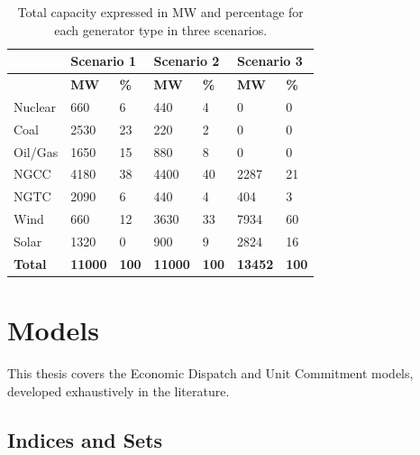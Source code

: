 \documentclass[12pt,LUDisStyle,twosided]{book}
\begin{document}
\begin{table}[h]
\centering
\begin{tabular}{|lllllll|}
\hline
 & \multicolumn{2}{l}{\textbf{Scenario 1}} & \multicolumn{2}{l}{\textbf{Scenario 2}} & \multicolumn{2}{l|}{\textbf{Scenario 3}} \\ \hline
 & \textbf{MW} & \textbf{\%} & \textbf{MW} & \textbf{\%} & \textbf{MW} & \textbf{\%} \\ \hline
Nuclear & 660 & 6 & 440 & 4 & 0 & 0 \\ \hline
Coal & 2530 & 23 & 220 & 2 & 0 & 0 \\ \hline
Oil/Gas & 1650 & 15 & 880 & 8 & 0 & 0 \\ \hline
NGCC & 4180 & 38 & 4400 & 40 & 2287 & 21 \\ \hline
NGTC & 2090 & 6 & 440 & 4 & 404 & 3 \\ \hline
Wind & 660 & 12 & 3630 & 33 & 7934 & 60 \\ \hline
Solar & 1320 & 0 & 900 & 9 & 2824 & 16 \\ \hline
\textbf{Total} & \textbf{11000} & \textbf{100} & \textbf{11000} & \textbf{100} & \textbf{13452} & \textbf{100} \\ \hline
\end{tabular}
\caption{Total capacity expressed in MW and percentage for each generator type in three scenarios.}
\label{table:ScenarioDataDescription}
\end{table}



\section{Models}

This thesis covers the Economic Dispatch and Unit Commitment models, developed exhaustively in the literature.

\subsection{Indices and Sets}
\end{document}
